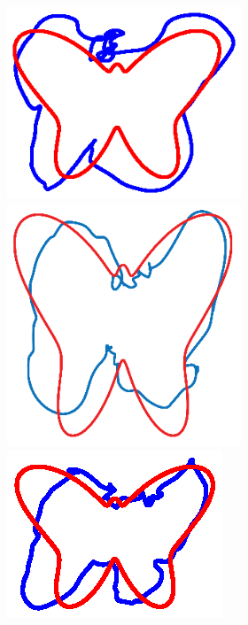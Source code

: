 \begin{figure}
\begin{subfigure}{\textwidth}
\begin{subfigure}{\textwidth}
        \includegraphics[trim=3cm 4cm 3cm 4cm, clip=true,height=.1\textheight]{Figures/Fig_T1/MATLAB/RHML_T1_Trajectory}
        \hspace{4em}
        \includegraphics[height=.08\textheight]{Figures/Fig_T1/Orig/RMHL_T1_Trajectory}
        \hspace{4em}
        \includegraphics[trim=6cm 4.5cm 6cm 4.5cm, clip=true,height=.1\textheight]{Figures/Fig_T1/Python/RHML_T1_Trajectory}
        
        \end{subfigure}
         

\end{subfigure}
\end{figure}
